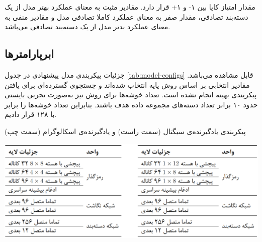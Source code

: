 مقدار امتیاز کاپا بین ۱- و ۱+ قرار دارد. مقادیر مثبت به معنای عملکرد بهتر مدل از یک دسته‌بند تصادفی، مقدار صفر به معنای عملکرد کاملا تصادفی مدل و مقادیر منفی به معنای عملکرد بدتر مدل از یک دسته‌بند تصادفی می‌باشد.

\subsection{ابرپارامترها}

جزئیات پیکربندی مدل پیشنهادی در جدول \ref{tab:model-configs}
قابل مشاهده می‌باشد. مقادیر انتخابی بر اساس روش پایه \cite{taghanaki2023self} انتخاب شده‌اند و جستجوی گسترده‌ای برای یافتن پیکربندی بهینه انجام نشده است. تعداد خوشه‌ها برای روش  نیز به‌صورت تجربی بایستی حدود ۱۰ برابر تعداد دسته‌های مجموعه داده هدف باشند\cite{caron2020unsupervised}. بنابراین تعداد خوشه‌ها را برابر با ۱۲۸ قرار دادیم.

\begin{table}[ht]
\centering
\caption{پیکربندی یادگیرنده‌ی سیگنال (سمت راست) و یادگیرنده‌ی اسکالوگرام (سمت چپ)}
\includegraphics[width=1\textwidth]{Images/Chapter4/structure-table.png}
\label{tab:model-configs}
\end{table}


